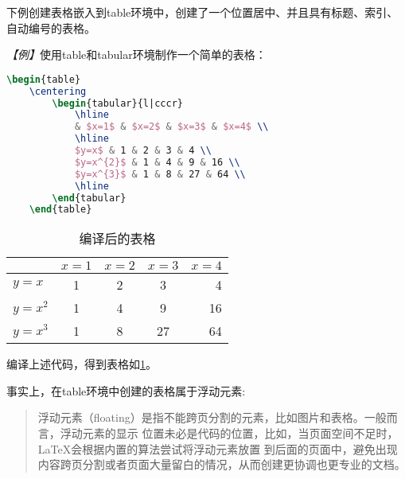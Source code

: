 下例创建表格嵌入到table环境中，创建了一个位置居中、并且具有标题、索引、自动编号的表格。

\emph{【例】}使用table和tabular环境制作一个简单的表格：
\begin{lstlisting}[language=TeX]
    \begin{table}
    \centering
        \begin{tabular}{l|cccr}
            \hline
            & $x=1$ & $x=2$ & $x=3$ & $x=4$ \\
            \hline
            $y=x$ & 1 & 2 & 3 & 4 \\
            $y=x^{2}$ & 1 & 4 & 9 & 16 \\
            $y=x^{3}$ & 1 & 8 & 27 & 64 \\
            \hline
        \end{tabular}
    \end{table}
\end{lstlisting}

\begin{table}
    \centering
    \begin{tabular}{l|cccr}
        \hline
                  & $x=1$ & $x=2$ & $x=3$ & $x=4$ \\
        \hline
        $y=x$     & 1     & 2     & 3     & 4     \\
        $y=x^{2}$ & 1     & 4     & 9     & 16    \\
        $y=x^{3}$ & 1     & 8     & 27    & 64    \\
        \hline
    \end{tabular}
    \caption{编译后的表格}
    \label{tb2}
\end{table}

编译上述代码，得到表格如\ref{tb2}。

事实上，在table环境中创建的表格属于浮动元素:
\begin{quote}
    浮动元素（floating）是指不能跨页分割的元素，比如图片和表格。一般而言，浮动元素的显示
    位置未必是代码的位置，比如，当页面空间不足时，LaTeX会根据内置的算法尝试将浮动元素放置
    到后面的页面中，避免出现内容跨页分割或者页面大量留白的情况，从而创建更协调也更专业的文档。
\end{quote}

